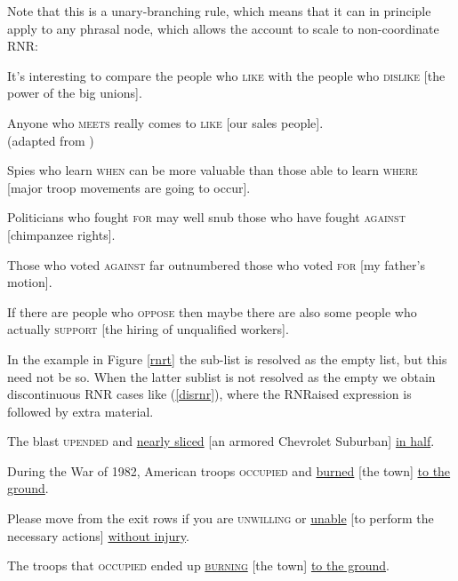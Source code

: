 \documentclass[output=paper]{langsci/langscibook}
\begin{document}
\noindent
Note that this is a unary-branching rule, which means that it can in principle apply to any phrasal node, which allows the account to scale to non-coordinate RNR:

\begin{exe}
\ex \begin{xlista}
\ex  It's interesting to compare the people who \textsc{like} with the people
       who \textsc{dislike} [the power of the big unions].\\
       \citep[550]{hudson}

 \ex Anyone  who \textsc{meets} really comes to \textsc{like} [our sales people].\\
 (adapted from \citet{
williams})\label{will}


\ex   Spies who learn \textsc{when} can be more valuable than those
able to learn \textsc{where} [major troop movements are going to occur].

\ex Politicians who fought \textsc{for} may well snub those
 who have fought \textsc{against} [chimpanzee rights]. \\
\citep{postal94}

\ex Those who voted \textsc{against} far outnumbered those who
voted  \textsc{for} [my father's motion].\\
\citep[1344]{rodney2}


\ex If there are people who \textsc{oppose} then maybe there are also some
  people who actually \textsc{support}  [the hiring of unqualified
  workers].\\
  \citep{chavesrnr}

\end{xlista}


\end{exe}








In the example in Figure \ref{rnrt}  the sub-list  is resolved as the empty list, but this need not be so. When the latter sublist is not resolved as the empty we obtain discontinuous RNR cases like (\ref{disrnr}), 
where the RNRaised expression is followed by extra material.


\begin{exe}
\ex \begin{xlista}
\ex The blast \textsc{upended} and \underline{\sc nearly sliced} [an armored Chevrolet Suburban] \underline{in half}.

\ex During the War of 1982, American troops
\textsc{occupied}  and \underline{\sc burned} [the town] \underline{to the ground}.

\ex Please move from the exit rows if you are \textsc{unwilling} or \underline{\sc unable}
 [to perform the necessary actions] \underline{without injury}.

\ex The troops that \textsc{occupied} ended up \underline{\textsc{burning}}
[the town] \underline{to the ground}.

\end{xlista}\label{disrnr}
\end{exe}
\end{document}
